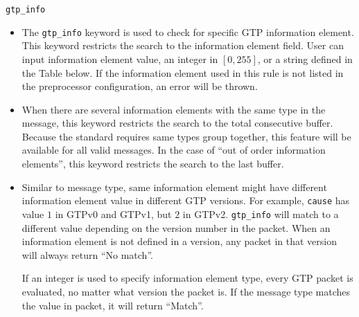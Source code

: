 \documentclass[english]{report}
\begin{document}
\texttt{gtp\_info}
\label{gtp:gtp_info}
\begin{itemize}
\item[] The \texttt{gtp\_info} keyword is used to check for specific GTP 
  information element. This keyword restricts the search to the information 
  element field. User can input information element value, an integer in 
  $[0, 255]$, or a string defined in the Table below.  If the information 
  element used in this rule is not listed in the preprocessor configuration,
  an error will be thrown.
   
\item[]  When there are several information elements with the same type in the
  message, this keyword restricts the search to the total consecutive buffer. 
  Because the standard requires same types group together, this feature will be
  available for all valid messages. In the case of ``out of order information 
  elements'', this keyword restricts the search to the last buffer.
   
\item[] Similar to message type, same information element might have different 
  information element value in different GTP versions. For example, 
  \texttt{cause} has value $1$ in GTPv0 and GTPv1, but $2$ in GTPv2. 
  \texttt{gtp\_info} will match to  a different
  value depending on the version number in the packet. When an information 
  element is not defined in a version, any packet in that version will always
  return ``No match''.
  
  If an integer is used to specify information element type, every GTP packet
  is evaluated, no matter what version the packet is. If the message type 
  matches the value in packet, it will return ``Match''.\\


\end{itemize}
\end{document}
